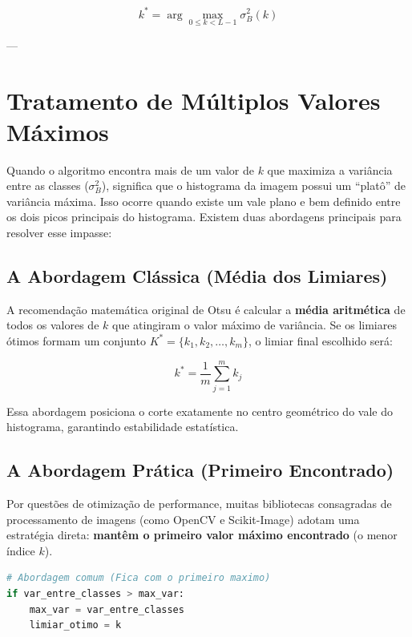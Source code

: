\documentclass[12pt, a4paper]{article}
\begin{document}
\begin{equation}
    k^* = \arg\max_{0 \le k < L-1} \sigma_B^2(k)
\end{equation}

---

\section{Tratamento de Múltiplos Valores Máximos}

Quando o algoritmo encontra mais de um valor de $k$ que maximiza a variância entre as classes ($\sigma_B^2$), significa que o histograma da imagem possui um ``platô'' de variância máxima. Isso ocorre quando existe um vale plano e bem definido entre os dois picos principais do histograma. Existem duas abordagens principais para resolver esse impasse:

\subsection{A Abordagem Clássica (Média dos Limiares)}
A recomendação matemática original de Otsu é calcular a \textbf{média aritmética} de todos os valores de $k$ que atingiram o valor máximo de variância. Se os limiares ótimos formam um conjunto $K^* = \{k_1, k_2, \dots, k_m\}$, o limiar final escolhido será:

\begin{equation}
    k^* = \frac{1}{m} \sum_{j=1}^{m} k_j
\end{equation}

Essa abordagem posiciona o corte exatamente no centro geométrico do vale do histograma, garantindo estabilidade estatística.

\subsection{A Abordagem Prática (Primeiro Encontrado)}
Por questões de otimização de performance, muitas bibliotecas consagradas de processamento de imagens (como OpenCV e Scikit-Image) adotam uma estratégia direta: \textbf{mantêm o primeiro valor máximo encontrado} (o menor índice $k$).

\begin{lstlisting}[language=Python, caption={Lógica de atribuição padrão em bibliotecas.}]
# Abordagem comum (Fica com o primeiro maximo)
if var_entre_classes > max_var:
    max_var = var_entre_classes
    limiar_otimo = k
\end{lstlisting}
\end{document}
